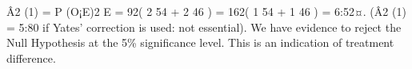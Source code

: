 \documentclass[a4paper,12pt]{article}
\begin{document}
\begin{enumerate}
Â2
(1) =
P (O¡E)2
E = 92( 2
54 + 2
46 ) = 162( 1
54 + 1
46 ) = 6:52¤.
(Â2
(1) = 5:80 if Yates’ correction is used: not essential).
We have evidence to reject the Null Hypothesis at the 5\% significance level. This is an indication
of treatment difference.\end{enumerate}
\end{document}

